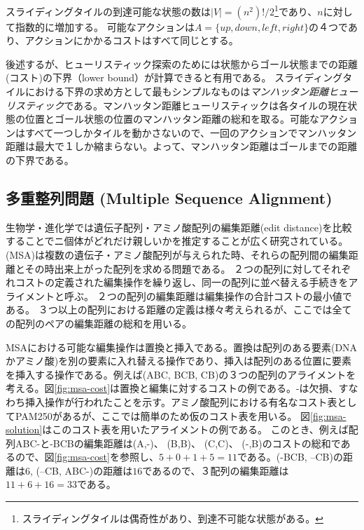 スライディングタイルの到達可能な状態の数は$|V| = (n^2)!/2$\footnote{スライディングタイルは偶奇性があり、到達不可能な状態がある\cite{johnson1879notes}。}であり、$n$に対して指数的に増加する。
可能なアクションは$A= \{up, down, left, right\}$の４つであり、アクションにかかるコストはすべて同じとする。

後述するが、ヒューリスティック探索のためには状態からゴール状態までの距離(コスト)の下界（lower bound）が計算できると有用である。
スライディングタイルにおける下界の求め方として最もシンプルなものは{\it マンハッタン距離ヒューリスティック}である。マンハッタン距離ヒューリスティックは各タイルの現在状態の位置とゴール状態の位置のマンハッタン距離の総和を取る。可能なアクションはすべて一つしかタイルを動かさないので、一回のアクションでマンハッタン距離は最大で１しか縮まらない。よって、マンハッタン距離はゴールまでの距離の下界である。


\subsection{多重整列問題 (Multiple Sequence Alignment)}
\label{sec:msa}
生物学・進化学では遺伝子配列・アミノ酸配列の編集距離(edit distance)を比較することでニ個体がどれだけ親しいかを推定することが広く研究されている。
 (MSA)は複数の遺伝子・アミノ酸配列が与えられた時、それらの配列間の編集距離とその時出来上がった配列を求める問題である。
２つの配列に対してそれぞれコストの定義された編集操作を繰り返し、同一の配列に並べ替える手続きをアライメントと呼ぶ。
２つの配列の編集距離は編集操作の合計コストの最小値である。
３つ以上の配列における距離の定義は様々考えられるが、ここでは全ての配列のペアの編集距離の総和を用いる。

MSAにおける可能な編集操作は置換と挿入である。置換は配列のある要素(DNAかアミノ酸)を別の要素に入れ替える操作であり、挿入は配列のある位置に要素を挿入する操作である。例えば(ABC, BCB, CB)の３つの配列のアライメントを考える。図\ref{fig:msa-cost}は置換と編集に対するコストの例である。-は欠損、すなわち挿入操作が行われたことを示す。アミノ酸配列における有名なコスト表としてPAM250\cite{pearson1990}があるが、ここでは簡単のため仮のコスト表を用いる。
図\ref{fig:msa-solution}はこのコスト表を用いたアライメントの例である。
このとき、例えば配列ABC-と-BCBの編集距離は(A,-)、 (B,B)、 (C,C)、 (-,B)のコストの総和であるので、図\ref{fig:msa-cost}を参照し、$5+0+1+5=11$である。(-BCB, --CB)の距離は$6$, (--CB, ABC-)の距離は$16$であるので、３配列の編集距離は$11+6+16=33$である。

